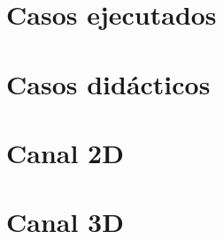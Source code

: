 \label{ch:cfd}


\section{Casos ejecutados}\label{sec:listcasos}
\section{Casos didácticos}\label{sec:casosd}
\section{Canal 2D}\label{sec:canal2d}
\section{Canal 3D}\label{sec:canal3d}
